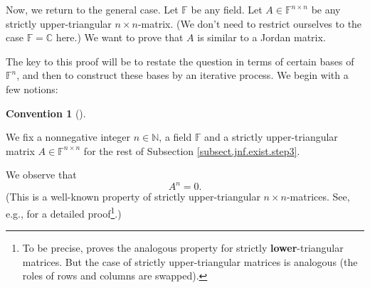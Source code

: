 \documentclass[numbers=enddot,12pt,final,onecolumn,notitlepage]{scrartcl}%
\numberwithin{exer}{subsection}
\theoremstyle{definition}
\newtheorem{conv}[theo]{Convention}
\newenvironment{convention}[1][]
{\begin{conv}[#1]\begin{leftbar}}
{\end{leftbar}\end{conv}}
\begin{document}
Now, we return to the general case. Let $\mathbb{F}$ be any field. Let
$A\in\mathbb{F}^{n\times n}$ be any strictly upper-triangular $n\times
n$-matrix. (We don't need to restrict ourselves to the case $\mathbb{F}%
=\mathbb{C}$ here.) We want to prove that $A$ is similar to a Jordan matrix.

The key to this proof will be to restate the question in terms of certain
bases of $\mathbb{F}^{n}$, and then to construct these bases by an iterative
process. We begin with a few notions:

\begin{convention}
We fix a nonnegative integer $n\in\mathbb{N}$, a field $\mathbb{F}$ and a
strictly upper-triangular matrix $A\in\mathbb{F}^{n\times n}$ for the rest of
Subsection \ref{subsect.jnf.exist.step3}.
\end{convention}

We observe that%
\begin{equation}
A^{n}=0. \label{eq.jnf.exist.step3.An=0}%
\end{equation}
(This is a well-known property of strictly upper-triangular $n\times
n$-matrices. See, e.g., \cite[Corollary 3.78]{lina} for a detailed
proof\footnote{To be precise, \cite[Corollary 3.78]{lina} proves the analogous
property for strictly \textbf{lower}-triangular matrices. But the case of
strictly upper-triangular matrices is analogous (the roles of rows and columns
are swapped).}.)
\end{document}
